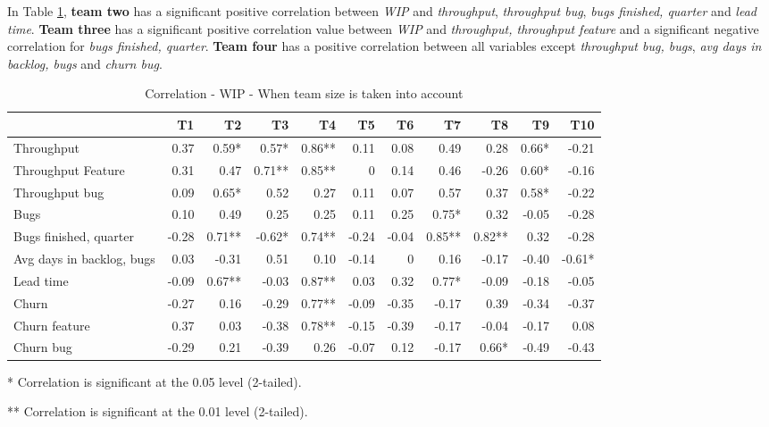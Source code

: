 \documentclass[UKenglish]{ifimaster}  %
\begin{document}
In Table \ref{corr:WIP:V2}, \textbf{team two} has a significant positive correlation between \textit{WIP} and \textit{throughput}, \textit{throughput bug},  \textit{bugs finished, quarter} and \textit{lead time}. \textbf{Team three} has a significant positive correlation value between \textit{WIP} and \textit{throughput, throughput feature} and a significant negative correlation for \textit{bugs finished, quarter}. \textbf{Team four} has a positive correlation between all variables except \textit{throughput bug, bugs}, \textit{avg days in backlog, bugs} and \textit{churn bug}. 



\begin{table}[H]
  \begin{adjustwidth}{-1.5cm}{}
 \center
  \captionsetup{justification=centering}
 \begin{tabular}{|l|r|r|r|r|r|r|r|r|r|r|}
\hline
 &  \bf{T1} & \bf{T2} & \bf{T3} & \bf{T4} & \bf{T5} & \bf{T6} & \bf{T7} & \bf{T8} & \bf{T9} & \bf{T10}\\ \hline
 Throughput  & 0.37 & 0.59* & 0.57* & 0.86** & 0.11 & 0.08 & 0.49 & 0.28 & 0.66* & -0.21 \\ \hline
 Throughput Feature  & 0.31 & 0.47 & 0.71** & 0.85** & 0 &0.14 & 0.46 & -0.26 & 0.60* & -0.16 \\ \hline
 Throughput bug  & 0.09 & 0.65* & 0.52 & 0.27 & 0.11 & 0.07 & 0.57 & 0.37 & 0.58* & -0.22 \\ \hline
 Bugs  & 0.10 & 0.49 & 0.25 & 0.25 & 0.11 & 0.25 & 0.75* & 0.32 & -0.05 & -0.28 \\ \hline
 Bugs finished, quarter  & -0.28 & 0.71** & -0.62* & 0.74** & -0.24 & -0.04 & 0.85** & 0.82** & 0.32 & -0.28 \\ \hline
 Avg days in backlog, bugs  & 0.03 & -0.31 & 0.51 & 0.10 & -0.14 & 0 &0.16 & -0.17 & -0.40 & -0.61* \\ \hline
 Lead time  & -0.09 & 0.67** & -0.03 & 0.87** & 0.03 & 0.32 & 0.77* & -0.09 & -0.18 & -0.05 \\ \hline
 Churn  & -0.27 & 0.16 & -0.29 & 0.77** & -0.09 & -0.35 & -0.17 & 0.39 & -0.34 & -0.37 \\ \hline
 Churn feature  & 0.37 & 0.03 & -0.38 & 0.78** & -0.15 & -0.39 & -0.17 & -0.04 & -0.17 & 0.08 \\ \hline
 Churn bug  & -0.29 & 0.21 & -0.39 & 0.26 & -0.07 & 0.12 & -0.17 & 0.66* & -0.49 & -0.43 \\ \hline
\end{tabular}
 \caption{Correlation - WIP - When team size is taken into account}
 \label{corr:WIP:V2}
 \centerline {* Correlation is significant at the 0.05 level (2-tailed).}
\centerline{** Correlation is significant at the 0.01 level (2-tailed).}
\end{adjustwidth}
\end{table}
\end{document}
